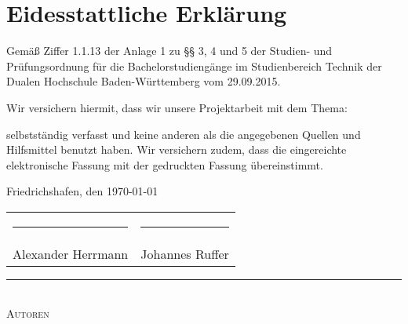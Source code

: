 \chapter*{Eidesstattliche Erklärung} %


Gemäß Ziffer 1.1.13 der Anlage 1 zu §§ 3, 4 und 5  der Studien- und Prüfungsordnung für die Bachelorstudiengänge im Studienbereich Technik der Dualen Hochschule Baden-Würt­tem­berg vom 29.09.2015.

Wir versichern hiermit, dass wir unsere Projektarbeit mit dem Thema: 

\begin{quote}
	\textit{\titel} \textit{ \untertitel }
\end{quote}

selbstständig verfasst und keine anderen als die angegebenen Quellen und Hilfsmittel benutzt haben. Wir versichern zudem, dass die eingereichte elektronische Fassung mit der gedruckten Fassung übereinstimmt.

Friedrichshafen, den \today \\[2ex]

\begin{center}

\begin{tabular}{cc}
	\rule[-0.2cm]{0.3\linewidth}{0.5pt} & \rule[-0.2cm]{0.3\linewidth}{0.5pt}\\
	Alexander Herrmann & Johannes Ruffer\\
\end{tabular}

\rule{0.75\linewidth}{0.1pt}\\
\textsc{Autoren} \\[10ex]
\end{center}



\normalsize

\rmfamily



\cleardoublepage